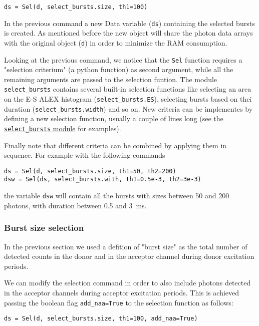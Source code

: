 \begin{verbatim}
ds = Sel(d, select_bursts.size, th1=100)
\end{verbatim}

In the previous command a new Data variable (\verb|ds|) containing the selected bursts is created. As mentioned before the new object will share the photon data arrays with the original object (\verb|d|) in order to minimize the RAM consumption.

Looking at the previous command, we notice that the \verb|Sel| function requires a "selection criterium" (a python function) as second argument, while all the remaining arguments are passed to the selection funtion. The module \verb|select_bursts| contains several built-in selection functions like
selecting an area on the E-S ALEX histogram (\verb|select_bursts.ES|), 
selecting bursts based on thei duration (\verb|select_bursts.width|) and so on. New criteria can be implementes by defining a new selection function, usually a couple of lines long (see the \href{https://github.com/tritemio/FRETBursts/blob/master/fretbursts/select_bursts.py}{\verb|select_bursts| module} for examples).

Finally note that different criteria can be combined by applying them
in sequence. For example with the following commands

\begin{verbatim}
ds = Sel(d, select_bursts.size, th1=50, th2=200)
dsw = Sel(ds, select_bursts.with, th1=0.5e-3, th2=3e-3)
\end{verbatim}

the variable \verb|dsw| will contain all the bursts with sizes between 50 and 200 photons, with duration between 0.5 and 3~ms.

\subsubsection{Burst size selection}

In the previous section we used a defition of "burst size" as the total number of detected counts in the donor and in the acceptor channel during donor excitation periods. 

We can modify the selection command in order to also include photons detected in the acceptor channels during acceptor excitation periods. This is achieved passing the boolean flag \verb|add_naa=True| to the selection function as follows:

\begin{verbatim}
ds = Sel(d, select_bursts.size, th1=100, add_naa=True)
\end{verbatim}

